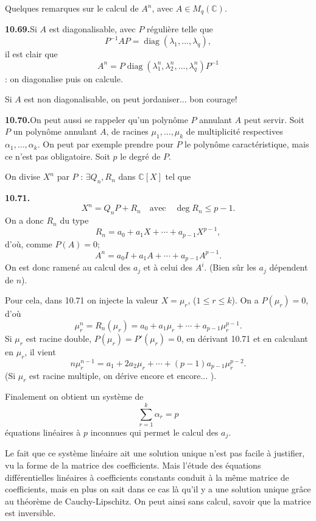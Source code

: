 \begingroup
\setlength{\abovedisplayskip}{2pt}
\setlength{\belowdisplayskip}{2pt}
\setlength{\abovedisplayshortskip}{1pt}
\setlength{\belowdisplayshortskip}{1pt}
Quelques remarques sur le calcul de $A^n$, avec $A\in M_q(\mathbb C)$.

\noindent\textbf{10.69.}\quad Si $A$ est diagonalisable, avec $P$ régulière telle que
\[
P^{-1}AP=\operatorname{diag}(\lambda_1,\ldots,\lambda_q),
\]
il est clair que
\[
A^n=P\operatorname{diag}(\lambda_1^n,\lambda_2^n,\ldots,\lambda_q^n)P^{-1}
\]
: on diagonalise puis on calcule.

Si $A$ est non diagonalisable, on peut jordaniser... bon courage!

\noindent\textbf{10.70.}\quad On peut aussi se rappeler qu'un polynôme $P$ annulant $A$ peut servir.
Soit $P$ un polynôme annulant $A$, de racines $\mu_1,\ldots,\mu_k$ de multiplicité respectives $\alpha_1,\ldots,\alpha_k$. On peut par exemple prendre pour $P$ le polynôme caractéristique, mais ce n'est pas obligatoire. Soit $p$ le degré de $P$.

On divise $X^n$ par $P$ : $\exists Q_n,R_n$ dans $\mathbb C[X]$ tel que

\noindent\textbf{10.71.}\quad \[
X^n=Q_nP+R_n
\quad\text{avec}\quad \deg R_n\le p-1.
\]
On a donc $R_n$ du type
\[
R_n=a_0+a_1X+\cdots+a_{p-1}X^{p-1},
\]
d'où, comme $P(A)=0$;
\[
A^n=a_0I+a_1A+\cdots+a_{p-1}A^{p-1}.
\]
On est donc ramené au calcul des $a_j$ et à celui des $A^i$. (Bien sûr les $a_j$ dépendent de $n$).

Pour cela, dans 10.71 on injecte la valeur $X=\mu_r$, ($1\le r\le k$). On a $P(\mu_r)=0$, d'où
\[
\mu_r^n=R_n(\mu_r)=a_0+a_1\mu_r+\cdots+a_{p-1}\mu_r^{p-1}.
\]
Si $\mu_r$ est racine double, $P(\mu_r)=P'(\mu_r)=0$, en dérivant 10.71 et en calculant en $\mu_r$, il vient
\[
n\mu_r^{n-1}=a_1+2a_2\mu_r+\cdots+(p-1)a_{p-1}\mu_r^{p-2}.
\]
(Si $\mu_r$ est racine multiple, on dérive encore et encore... ).

Finalement on obtient un système de
\[
\sum_{r=1}^k\alpha_r=p
\]
équations linéaires à $p$ inconnues qui permet le calcul des $a_j$.
\enlargethispage{4\baselineskip}

Le fait que ce système linéaire ait une solution unique n'est pas facile à justifier, vu la forme de la matrice des coefficients. Mais l'étude des équations différentielles linéaires à coefficients constants conduit à la même matrice de coefficients, mais en plus on sait dans ce cas là qu'il y a une solution unique grâce au théorème de Cauchy-Lipschitz. On peut ainsi sans calcul, savoir que la matrice est inversible.
\endgroup
